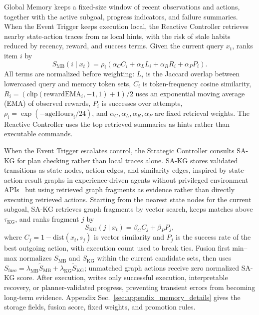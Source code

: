 Global Memory keeps a fixed-size window of recent observations and actions,
together with the active subgoal, progress indicators, and failure summaries.
When the Event Trigger keeps execution local, the Reactive Controller
retrieves nearby state-action traces from \samb{} as local hints, with the risk
of stale habits reduced by recency, reward, and success terms. Given the current
query $x_t$, \samb{} ranks item $i$ by
\begin{equation}
\label{eq:samb_score}
S_{\mathrm{MB}}(i \mid x_t)=\rho_i(\alpha_C C_i+\alpha_L L_i+\alpha_R R_i+\alpha_P P_i).
\end{equation}
All terms are normalized before weighting: $L_i$ is the Jaccard overlap between
lowercased query and memory token sets, $C_i$ is token-frequency cosine
similarity, $R_i=(\mathrm{clip}(\mathrm{rewardEMA}_i,-1,1)+1)/2$ uses an
exponential moving average (EMA) of observed rewards, $P_i$ is
successes over attempts, $\rho_i=\exp(-\mathrm{ageHours}_i/24)$, and
$\alpha_C,\alpha_L,\alpha_R,\alpha_P$ are fixed retrieval weights. The Reactive
Controller uses the top retrieved summaries as hints rather than executable
commands.

When the Event Trigger escalates control, the Strategic Controller
consults SA-KG for plan checking rather than local traces alone.
SA-KG stores validated transitions as state nodes, action edges, and similarity
edges, inspired by state-action-result graphs in experience-driven agents
without privileged environment APIs~\citep{tang2025experiencedriven} but using
retrieved graph fragments as evidence rather than directly executing retrieved
actions.
Starting from the nearest state nodes for the current subgoal, SA-KG retrieves
graph fragments by vector search, keeps matches above $\tau_{\mathrm{KG}}$, and
ranks fragment $j$ by
\begin{equation}
\label{eq:sakg_score}
S_{\mathrm{KG}}(j \mid x_t)=\beta_C C_j+\beta_P P_j,
\end{equation}
where $C_j=1-\mathrm{dist}(x_t,s_j)$ is vector similarity and $P_j$ is the
success rate of the best outgoing action, with execution count used to break
ties. Fusion first min--max normalizes $S_{\mathrm{MB}}$ and $S_{\mathrm{KG}}$
within the current candidate sets, then uses
$S_{\mathrm{fuse}}=\lambda_{\mathrm{MB}}\tilde S_{\mathrm{MB}}+\lambda_{\mathrm{KG}}\tilde S_{\mathrm{KG}}$;
unmatched graph actions receive zero normalized SA-KG score. After execution,
\method{} writes only successful execution, interpretable recovery, or
planner-validated progress, preventing transient errors from becoming long-term
evidence. Appendix Sec.~\mbox{\ref{sec:appendix_memory_details}} gives the
storage fields, fusion score, fixed weights, and promotion rules.
